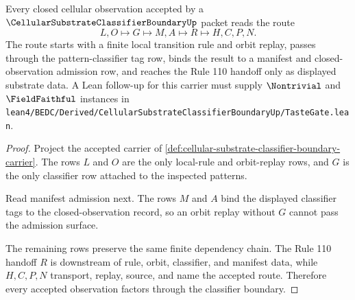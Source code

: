 

\begin{theorem}
\label{thm:cellular-substrate-classifier-boundary-closed-observation-handoff}
Every closed cellular observation accepted by a $\CellularSubstrateClassifierBoundaryUp$ packet reads the route
$$
L,O \longmapsto G \longmapsto M,A \longmapsto R \longmapsto H,C,P,N .
$$
The route starts with a finite local transition rule and orbit replay, passes through the pattern-classifier tag row, binds the result to a manifest and closed-observation admission row, and reaches the Rule 110 handoff only as displayed substrate data. A Lean follow-up for this carrier must supply $\Nontrivial$ and $\FieldFaithful$ instances in \texttt{lean4/BEDC/Derived/CellularSubstrateClassifierBoundaryUp/TasteGate.lean}.
\end{theorem}
\begin{proof}
Project the accepted carrier of \autoref{def:cellular-substrate-classifier-boundary-carrier}. The rows $L$ and $O$ are the only local-rule and orbit-replay rows, and $G$ is the only classifier row attached to the inspected patterns.

Read manifest admission next. The rows $M$ and $A$ bind the displayed classifier tags to the closed-observation record, so an orbit replay without $G$ cannot pass the admission surface.

The remaining rows preserve the same finite dependency chain. The Rule 110 handoff $R$ is downstream of rule, orbit, classifier, and manifest data, while $H,C,P,N$ transport, replay, source, and name the accepted route. Therefore every accepted observation factors through the classifier boundary.
\end{proof}


